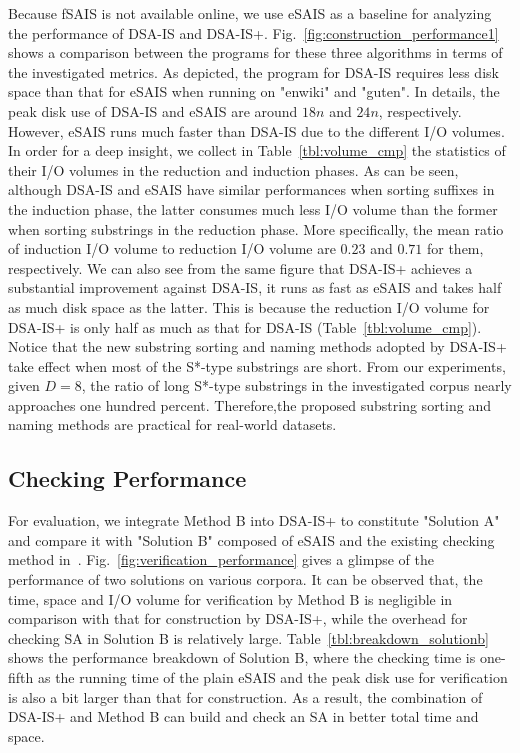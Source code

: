 \documentclass[10pt,journal,compsoc]{IEEEtran}
\begin{document}
Because fSAIS is not available online, we use eSAIS as a baseline for analyzing the performance of DSA-IS and DSA-IS+. Fig.~\ref{fig:construction_performance1} shows a comparison between the programs for these three algorithms in terms of the investigated metrics. As depicted, the program for DSA-IS requires less disk space than that for eSAIS when running on "enwiki" and "guten". In details, the peak disk use of DSA-IS and eSAIS are around $18n$ and $24n$, respectively. However, eSAIS runs much faster than DSA-IS due to the different I/O volumes. In order for a deep insight, we collect in Table~\ref{tbl:volume_cmp} the statistics of their I/O volumes in the reduction and induction phases. As can be seen, although DSA-IS and eSAIS have similar performances when sorting suffixes in the induction phase, the latter consumes much less I/O volume than the former when sorting substrings in the reduction phase. More specifically, the mean ratio of induction I/O volume to reduction I/O volume are $0.23$ and $0.71$ for them, respectively. We can also see from the same figure that DSA-IS+ achieves a substantial improvement against DSA-IS, it runs as fast as eSAIS and takes half as much disk space as the latter. This is because the reduction I/O volume for DSA-IS+ is only half as much as that for DSA-IS (Table~\ref{tbl:volume_cmp}). Notice that the new substring sorting and naming methods adopted by DSA-IS+ take effect when most of the S*-type substrings are short. From our experiments, given $D = 8$, the ratio of long S*-type substrings in the investigated corpus nearly approaches one hundred percent. Therefore,the proposed substring sorting and naming methods are practical for real-world datasets.

\subsection{Checking Performance}

For evaluation, we integrate Method B into DSA-IS+ to constitute "Solution A" and compare it with "Solution B" composed of eSAIS and the existing checking method in~\cite{Dementiev2008a}. Fig.~\ref{fig:verification_performance} gives a glimpse of the performance of two solutions on various corpora. It can be observed that, the time, space and I/O volume for verification by Method B is negligible in comparison with that for construction by DSA-IS+, while the overhead for checking SA in Solution B is relatively large. Table~\ref{tbl:breakdown_solutionb} shows the performance breakdown of Solution B, where the checking time is one-fifth as the running time of the plain eSAIS and the peak disk use for verification is also a bit larger than that for construction. As a result, the combination of DSA-IS+ and Method B can build and check an SA in better total time and space.
\end{document}
